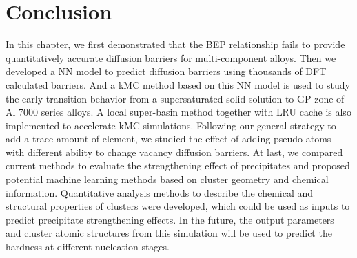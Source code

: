 \section{Conclusion}
\label{Chap:Al/Vac:section:Conc}


In this chapter, we first demonstrated that the \acf{BEP} relationship fails to provide quantitatively accurate diffusion barriers for multi-component alloys. Then we developed a \ac{NN} model to predict diffusion barriers using thousands of \ac{DFT} calculated barriers. And a \ac{kMC} method based on this \ac{NN} model is used to study the early transition behavior from a supersaturated solid solution to \ac{GP} zone of Al 7000 series alloys. A local super-basin method together with \ac{LRU} cache is also implemented to accelerate \ac{kMC} simulations. Following our general strategy to add a trace amount of element, we studied the effect of adding pseudo-atoms with different ability to change vacancy diffusion barriers. At last, we compared current methods to evaluate the strengthening effect of precipitates and proposed potential machine learning methods based on cluster geometry and chemical information. Quantitative analysis methods to describe the chemical and structural properties of clusters were developed, which could be used as inputs to predict precipitate strengthening effects. In the future, the output parameters and cluster atomic structures from this simulation will be used to predict the hardness at different nucleation stages.


